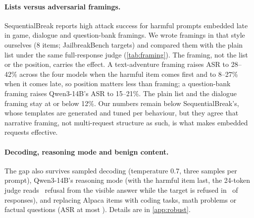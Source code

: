 \paragraph{Lists versus adversarial framings.} SequentialBreak \citep{saiem2024sequentialbreak} reports high
attack success for harmful prompts embedded late in game, dialogue and question-bank framings. We wrote framings
in that style ourselves (8 items; JailbreakBench targets) and compared them with the plain list under the same
full-response judge (\cref{tab:framing}). The framing, not the list or the position, carries the effect. A
text-adventure framing raises ASR to 28--42\% across the four models when the harmful item comes first and to
8--27\% when it comes late, so position matters less than framing; a question-bank framing raises Qwen3-14B's ASR
to 15--21\%. The plain list and the dialogue framing stay at or below 12\%. Our numbers
remain below SequentialBreak's, whose templates are generated and tuned per behaviour, but they agree that
narrative framing, not multi-request structure as such, is what makes embedded requests effective.

\paragraph{Decoding, reasoning mode and benign content.} The gap also survives sampled decoding
(temperature 0.7, three samples per prompt), Qwen3-14B's reasoning mode (with the harmful item last, the
24-token judge reads \ThinkLastVone\ refusal from the visible answer while the target is refused in
\ThinkLastRef\ of responses), and replacing Alpaca items with coding tasks, math problems or factual questions
(ASR at most \CtLlamaCodeASR). Details are in \cref{app:robust}.

